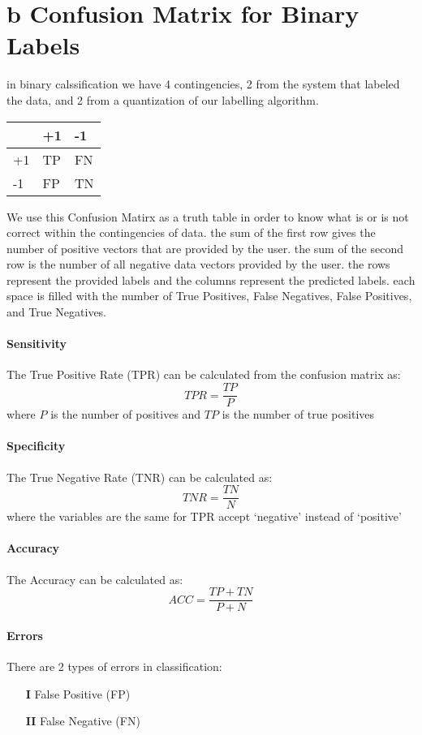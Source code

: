 \documentclass[12pt]{book}
\begin{document}
\section*{b Confusion Matrix for Binary Labels}
in binary calssification we have 4 contingencies, 2 from the system that labeled the data, and 2 
from a quantization of our labelling algorithm.
\begin{table}[h]
\centering
\begin{tabular}{@{}lll@{}}
\toprule
                       & +1 & -1 \\ \midrule
\multicolumn{1}{l}{+1} & TP  & FN  \\
\multicolumn{1}{l}{-1} & FP  & TN  \\ \bottomrule
\end{tabular}
\end{table}

We use this Confusion Matirx as a truth table in order to know what is or is not correct
within the contingencies of data. the sum of the first row gives the number of positive
vectors that are provided by the user. the sum of the second row is the number of all negative
data vectors provided by the user. the rows represent the provided labels and the columns
represent the predicted labels. each space is filled with the number of True Positives, False 
Negatives, False Positives, and True Negatives.

\paragraph{Sensitivity}
The True Positive Rate (TPR) can be calculated from the confusion matrix as:
\[TPR = \frac{TP}{P}\]
where $P$ is the number of positives and $TP$ is the number of true positives

\paragraph{Specificity}
The True Negative Rate (TNR) can be calculated as:
\[TNR = \frac{TN}{N}\]
where the variables are the same for TPR accept `negative' instead of `positive' 

\paragraph{Accuracy}
The Accuracy can be calculated as:
\[ACC = \frac{TP + TN}{P + N}\]

\paragraph{Errors}
There are 2 types of errors in classification:
\begin{itemize}
        \item[\textbf{I}] False Positive (FP)
        \item[\textbf{II}] False Negative (FN)
\end{itemize}
\end{document}
